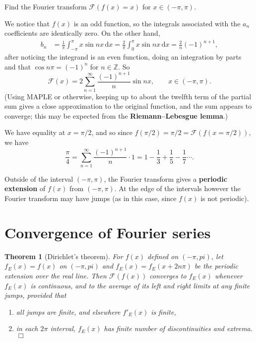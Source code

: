 \documentclass[letter-paper]{tufte-book}
\newtheorem{theorem}{\color{pastel-blue}Theorem}[section]
\newenvironment{example}[1][Example]{\begin{trivlist}
\item[\hskip \labelsep {\bfseries #1}]}{\end{trivlist}}
\newenvironment{remark}[1][Remark]{\begin{trivlist}
\item[\hskip \labelsep {\bfseries #1}]}{\end{trivlist}}
\newcommand\Def[1]{\textbf{#1}}
\newcommand{\qedwhite}{\hfill \ensuremath{\Box}}
\begin{document}
\begin{example}
  Find the Fourier transform $\mathcal{F}(f(x)=x)$ for $x\in(-\pi,\pi)$.
  
  We notice that $f(x)$ is an odd function, so the integrals associated with the
  $a_n$ coefficients are identically zero. On the other hand,
  \begin{align*}
    b_n &= \frac{1}{\pi}\int_{-\pi}^\pi x\sin nx\, \mathrm{d}x = \frac{2}{\pi}\int_{0}^\pi x\sin nx\, \mathrm{d}x = \frac{2}{n}(-1)^{n+1},
  \end{align*}
  after noticing the integrand is an even function, doing an integration by
  parts and that $\cos n\pi=(-1)^n$ for $n\in\mathbb{Z}$. So
  \begin{equation*}
    \mathcal{F}(x)=2\sum_{n=1}^\infty \frac{(-1)^{n+1}}{n}\sin nx,\qquad
    x\in(-\pi,\pi).
  \end{equation*}
  (Using MAPLE or otherwise, keeping up to about the twelfth term of the partial
  sum gives a close approximation to the original function, and the sum appears
  to converge; this may be expected from the \Def{Riemann--Lebesgue
  lemma}.)
\end{example}
\begin{remark}
  We have equality at $x=\pi/2$, and so since
  $f(\pi/2)=\pi/2=\mathcal{F}(f(x=\pi/2))$, we have
  \begin{equation*}
    \frac{\pi}{4} = \sum_{n=1}^\infty \frac{(-1)^{n+1}}{n}\cdot 1 = 
    1-\frac{1}{3}+\frac{1}{5}-\frac{1}{7}\cdots.
  \end{equation*}
  
  Outside of the interval $(-\pi,\pi)$, the Fourier transform gives a
  \Def{periodic extension} of $f(x)$ from $(-\pi,\pi)$. At the edge of the
  intervals however the Fourier transform may have jumps (as in this case, since
  $f(x)$ is not periodic).
\end{remark}


\section{Convergence of Fourier series}

\begin{theorem}[Dirichlet's theorem]
  For $f(x)$ defined on $(-\pi,pi)$, let $f_E(x)=f(x)$ on $(-\pi,pi)$ and
  $f_E(x)=f_E(x+2n\pi)$ be the periodic extension over the real line. Then
  $\mathcal{F}(f(x))$ converges to $f_E(x)$ whenever $f_E(x)$ is continuous, and
  to the average of its left and right limits at any finite jumps, provided that
  \begin{enumerate}
    \item all jumps are finite, and elsewhere $f'_E(x)$ is finite,
    \item in each $2\pi$ interval, $f_E(x)$ has finite number of discontinuities
    and extrema. \qedwhite
  \end{enumerate}
\end{theorem}
\end{document}
